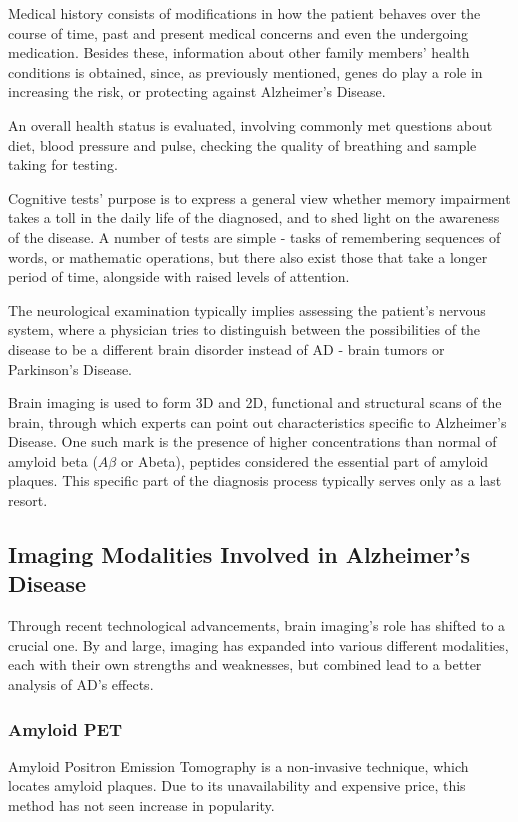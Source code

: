 \documentclass[a4paper, 12pt]{article}
\begin{document}
Medical history consists of modifications in how the patient behaves over the course of time, past and present medical concerns
and even the undergoing medication. Besides these, information about other family members' health conditions is obtained, since,
as previously mentioned, genes do play a role in increasing the risk, or protecting against Alzheimer's Disease.

An overall health status is evaluated, involving commonly met questions about diet, blood pressure and pulse, checking
the quality of breathing and sample taking for testing.

Cognitive tests' purpose is to express a general view whether memory impairment takes a toll in the daily life of the diagnosed,
and to shed light on the awareness of the disease. A number of tests are simple - tasks of remembering sequences of words, or
mathematic operations, but there also exist those that take a longer period of time, alongside with raised levels of attention.

The neurological examination typically implies assessing the patient's nervous system, where a physician tries to distinguish
between the possibilities of the disease to be a different brain disorder instead of AD - brain tumors or Parkinson's Disease.

Brain imaging is used to form 3D and 2D, functional and structural scans of the brain, through which experts can point out
characteristics specific to Alzheimer's Disease. One such mark is the presence of higher concentrations than normal of amyloid
beta ($A\beta $ or Abeta), peptides considered the essential part of amyloid plaques. This specific part of the diagnosis
process typically serves only as a last resort. \\
\cite{AA2}


\subsection{Imaging Modalities Involved in Alzheimer's Disease}
Through recent technological advancements, brain imaging's role has shifted to a crucial one. By and large, imaging has
expanded into various different modalities, each with their own strengths and weaknesses, but combined lead to a better
analysis of AD's effects. \cite{Johnson2012BrainII}

\subsubsection*{Amyloid PET}
Amyloid Positron Emission Tomography is a non-invasive technique, which locates amyloid plaques.
Due to its unavailability and expensive price, this method has not seen increase in popularity.
\\
\cite{Chapleau2022TheRO}
\end{document}

